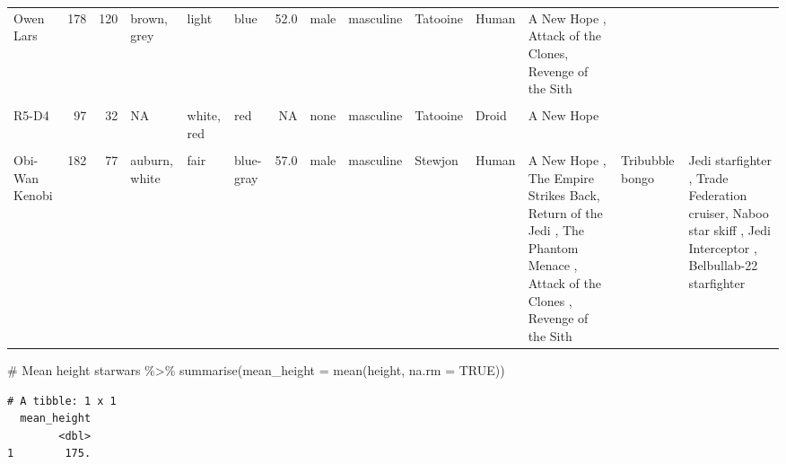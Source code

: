 \documentclass[
  man,
  floatsintext,
  longtable,
  nolmodern,
  notxfonts,
  notimes,
  colorlinks=true,linkcolor=blue,citecolor=blue,urlcolor=blue]{apa7}
\newenvironment{Shaded}{\begin{snugshade}}{\end{snugshade}}
\newcommand{\AttributeTok}[1]{\textcolor[rgb]{0.40,0.45,0.13}{#1}}
\newcommand{\CommentTok}[1]{\textcolor[rgb]{0.37,0.37,0.37}{#1}}
\newcommand{\ConstantTok}[1]{\textcolor[rgb]{0.56,0.35,0.01}{#1}}
\newcommand{\FunctionTok}[1]{\textcolor[rgb]{0.28,0.35,0.67}{#1}}
\newcommand{\NormalTok}[1]{\textcolor[rgb]{0.00,0.23,0.31}{#1}}
\newcommand{\SpecialCharTok}[1]{\textcolor[rgb]{0.37,0.37,0.37}{#1}}
\begin{document}
\begin{table}
\begin{tabular}{lrrlllrlllllll}
\addlinespace
Owen Lars & 178 & 120 & brown, grey & light & blue & 52.0 & male & masculine & Tatooine & Human & A New Hope          , Attack of the Clones, Revenge of the Sith &  & \\
\cellcolor{gray!10}{Beru Whitesun Lars} & \cellcolor{gray!10}{165} & \cellcolor{gray!10}{75} & \cellcolor{gray!10}{brown} & \cellcolor{gray!10}{light} & \cellcolor{gray!10}{blue} & \cellcolor{gray!10}{47.0} & \cellcolor{gray!10}{female} & \cellcolor{gray!10}{feminine} & \cellcolor{gray!10}{Tatooine} & \cellcolor{gray!10}{Human} & \cellcolor{gray!10}{A New Hope          , Attack of the Clones, Revenge of the Sith} & \cellcolor{gray!10}{} & \cellcolor{gray!10}{}\\
R5-D4 & 97 & 32 & NA & white, red & red & NA & none & masculine & Tatooine & Droid & A New Hope &  & \\
\cellcolor{gray!10}{Biggs Darklighter} & \cellcolor{gray!10}{183} & \cellcolor{gray!10}{84} & \cellcolor{gray!10}{black} & \cellcolor{gray!10}{light} & \cellcolor{gray!10}{brown} & \cellcolor{gray!10}{24.0} & \cellcolor{gray!10}{male} & \cellcolor{gray!10}{masculine} & \cellcolor{gray!10}{Tatooine} & \cellcolor{gray!10}{Human} & \cellcolor{gray!10}{A New Hope} & \cellcolor{gray!10}{} & \cellcolor{gray!10}{X-wing}\\
Obi-Wan Kenobi & 182 & 77 & auburn, white & fair & blue-gray & 57.0 & male & masculine & Stewjon & Human & A New Hope             , The Empire Strikes Back, Return of the Jedi     , The Phantom Menace     , Attack of the Clones   , Revenge of the Sith & Tribubble bongo & Jedi starfighter        , Trade Federation cruiser, Naboo star skiff        , Jedi Interceptor        , Belbullab-22 starfighter\\
\bottomrule
\end{tabular}
\end{table}

\begin{Shaded}
\begin{Highlighting}[]
\CommentTok{\# Mean height}
\NormalTok{starwars }\SpecialCharTok{\%\textgreater{}\%} \FunctionTok{summarise}\NormalTok{(}\AttributeTok{mean\_height =} \FunctionTok{mean}\NormalTok{(height, }\AttributeTok{na.rm =} \ConstantTok{TRUE}\NormalTok{))}
\end{Highlighting}
\end{Shaded}

\begin{verbatim}
# A tibble: 1 x 1
  mean_height
        <dbl>
1        175.
\end{verbatim}
\end{document}
